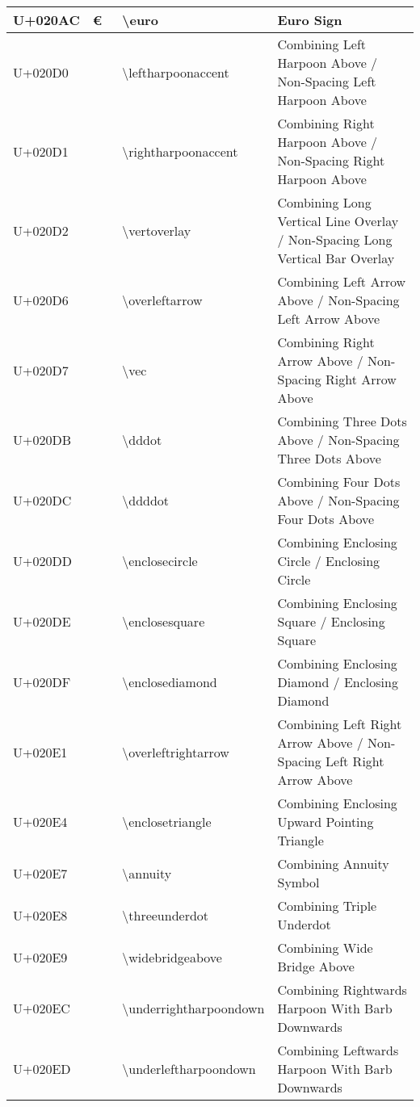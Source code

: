 \begin{table}[h]
\begin{tabulary}{\linewidth}{|L|L|L|L|}
\hline
U+020AC & € & {\textbackslash}euro & Euro Sign \\
\hline
U+020D0 &  ⃐  & {\textbackslash}leftharpoonaccent & Combining Left Harpoon Above / Non-Spacing Left Harpoon Above \\
\hline
U+020D1 &  ⃑  & {\textbackslash}rightharpoonaccent & Combining Right Harpoon Above / Non-Spacing Right Harpoon Above \\
\hline
U+020D2 &  ⃒  & {\textbackslash}vertoverlay & Combining Long Vertical Line Overlay / Non-Spacing Long Vertical Bar Overlay \\
\hline
U+020D6 &  ⃖  & {\textbackslash}overleftarrow & Combining Left Arrow Above / Non-Spacing Left Arrow Above \\
\hline
U+020D7 &  ⃗  & {\textbackslash}vec & Combining Right Arrow Above / Non-Spacing Right Arrow Above \\
\hline
U+020DB &  ⃛  & {\textbackslash}dddot & Combining Three Dots Above / Non-Spacing Three Dots Above \\
\hline
U+020DC &  ⃜  & {\textbackslash}ddddot & Combining Four Dots Above / Non-Spacing Four Dots Above \\
\hline
U+020DD &  ⃝  & {\textbackslash}enclosecircle & Combining Enclosing Circle / Enclosing Circle \\
\hline
U+020DE &  ⃞  & {\textbackslash}enclosesquare & Combining Enclosing Square / Enclosing Square \\
\hline
U+020DF &  ⃟  & {\textbackslash}enclosediamond & Combining Enclosing Diamond / Enclosing Diamond \\
\hline
U+020E1 &  ⃡  & {\textbackslash}overleftrightarrow & Combining Left Right Arrow Above / Non-Spacing Left Right Arrow Above \\
\hline
U+020E4 &  ⃤  & {\textbackslash}enclosetriangle & Combining Enclosing Upward Pointing Triangle \\
\hline
U+020E7 &  ⃧  & {\textbackslash}annuity & Combining Annuity Symbol \\
\hline
U+020E8 &  ⃨  & {\textbackslash}threeunderdot & Combining Triple Underdot \\
\hline
U+020E9 &  ⃩  & {\textbackslash}widebridgeabove & Combining Wide Bridge Above \\
\hline
U+020EC &  ⃬  & {\textbackslash}underrightharpoondown & Combining Rightwards Harpoon With Barb Downwards \\
\hline
U+020ED &  ⃭  & {\textbackslash}underleftharpoondown & Combining Leftwards Harpoon With Barb Downwards \\

\end{tabulary}
\end{table}
